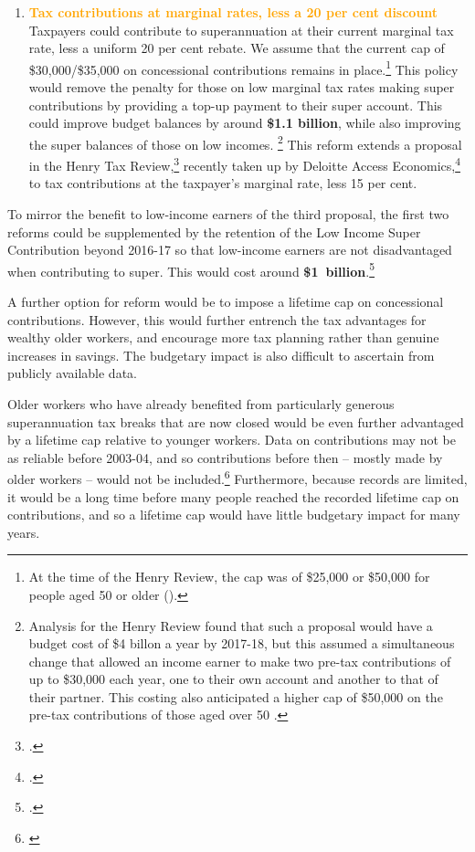 \begin{enumerate}
\item 
\textcolor{Orange}{\textbf{Tax contributions at marginal rates, less a 20 per cent discount}} \hspace{0.5em plus 0.5em}
Taxpayers could contribute to superannuation at their current marginal tax rate, less a uniform 20 per cent rebate. We assume that the current cap of \$30,000/\$35,000 on concessional contributions remains in place.\footnote{At the time of the Henry Review, the cap was of \$25,000 or \$50,000 for people aged 50 or older (\textcite[][100]{HenryTaxReview2010}).}  This policy would remove the penalty for those on low marginal tax rates making super contributions by providing a top-up payment to their super account. This could improve budget balances by around \textbf{\$1.1 billion}, while also improving the super balances of those on low incomes.%
\footnote{Analysis for the Henry Review found that such a proposal would have a budget cost of \$4 billon a year by 2017-18, but this assumed a simultaneous change that allowed an income earner to make two pre-tax contributions of up to \$30,000 each year, one to their own account and another to that of their partner. This costing also anticipated a higher cap of \$50,000 on the pre-tax contributions of those aged over 50 \textcite{Treasury2010SuperAdditionalMaterial} \textcite[][95]{HenryTaxReview2010}.}  
This reform extends a proposal in the Henry Tax Review,\footcite[][102]{Treasury2010IGR}  recently taken up by Deloitte Access Economics,\footcite{Deloitte2015TaxReformSheddingLight}  to tax contributions at the taxpayer’s marginal rate, less 15 per cent.
\end{enumerate}

To mirror the benefit to low-income earners of the third proposal, the first two reforms could be supplemented by the retention of the Low Income Super Contribution beyond 2016-17 so that low-income earners are not disadvantaged when contributing to super. This would cost around \textbf{\$1~billion}.\footcite[][Table~2.16, p.~206]{Treasury2013PortfolioBudgetStatement1314}

A further option for reform would be to impose a lifetime cap on concessional contributions. However, this would further entrench the tax advantages for wealthy older workers, and encourage more tax planning rather than genuine increases in savings. The budgetary impact is also difficult to ascertain from publicly available data. 

Older workers who have already benefited from particularly generous superannuation tax breaks that are now closed would be even further advantaged by a lifetime cap relative to younger workers. Data on contributions may not be as reliable before 2003-04, and so contributions before then – mostly made by older workers – would not be included.\footnote{\textcites{SuperContrTaxRegs1997}{ATO2003}{ATO2008}{ATO2014g}{ATO2014h}} Furthermore, because records are limited, it would be a long time before many people reached the recorded lifetime cap on contributions, and so a lifetime cap would have little budgetary impact for many years.

